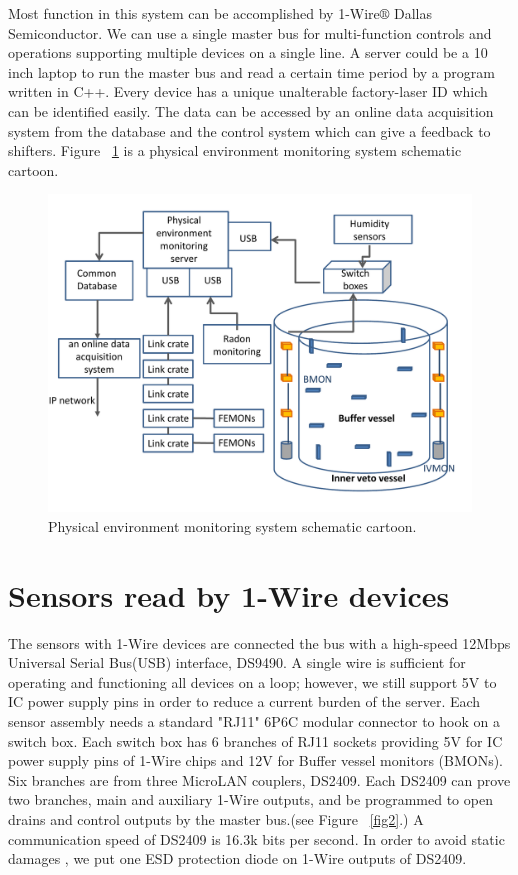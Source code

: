 \documentclass{JINST}
\begin{document}
Most function in this system can be accomplished by 1-Wire$\circledR$ Dallas Semiconductor.\cite{bib4} We can use a single master bus for multi-function controls and operations supporting multiple devices on a single line. A server could be a 10 inch laptop to run the master bus and read a certain time period by a program written in C++. Every device has a unique unalterable factory-laser ID which can be identified easily. The data can be accessed by an online data acquisition system from the database and the control system which can give a feedback to shifters.\cite{bib3} Figure ~\ref{fig1} is a physical environment monitoring system schematic cartoon.
\begin{figure}
\centering
\includegraphics[width=.6\textwidth]{slowmonpic.pdf}
\caption{Physical environment monitoring system schematic cartoon.}
\label{fig1}
\end{figure}

\section{Sensors read by 1-Wire devices }
The sensors with 1-Wire devices are connected the bus with a high-speed 12Mbps Universal Serial Bus(USB) interface, DS9490.\cite{bib5} A single wire is sufficient for operating and functioning all devices on a loop; however, we still support 5V to IC power supply pins in order to reduce a current burden of the server. Each sensor assembly needs a standard "RJ11" 6P6C modular connector to hook on a switch box. Each switch box has 6 branches of RJ11 sockets providing 5V for IC power supply pins of 1-Wire chips and 12V for Buffer vessel monitors (BMONs). Six branches are from three MicroLAN couplers\cite{bib6}, DS2409. Each DS2409 can prove two branches, main and auxiliary 1-Wire outputs, and be programmed to open drains and control outputs by the master bus.(see Figure ~\ref{fig2}.) A communication speed of DS2409 is 16.3k bits per second. In order to avoid static damages , we put one ESD protection diode on 1-Wire outputs of DS2409.
\end{document}
